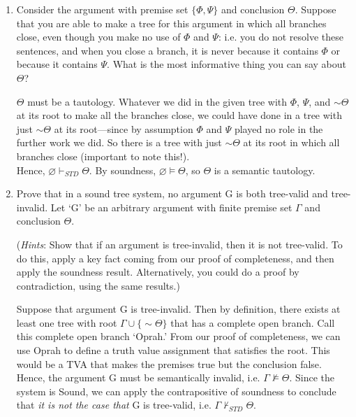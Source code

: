 \documentclass[12pt]{article}
\def\enot{\ensuremath{{\sim}}} %
\let\oldsim\sim %
\renewcommand{\sim}{{\oldsim}} %
\def\entails{\ensuremath{\vDash}}
\def\nentails{\ensuremath{\nvDash}}
\begin{document}
\begin{enumerate}


\item Consider the argument with premise set $\{\Phi, \Psi \}$ and conclusion $\Theta$. Suppose that you are able to make a tree for this argument in which all branches close, even though you make no use of $\Phi$ and $\Psi$: i.e. you do not resolve these sentences, and when you close a branch, it is never because it contains $\Phi$ or because it contains $\Psi$. What is the most informative thing you can say about $\Theta$?


$\Theta$ must be a tautology. Whatever we did in the given tree with $\Phi$, $\Psi$, and $\enot \Theta$ at its root to make all the branches close, we could have done in a tree with just $\enot \Theta$ at its root—since by assumption $\Phi$ and $\Psi$ played no role in the further work we did. So there is a tree with just $\enot \Theta$ at its root in which all branches close (important to note this!). \\ Hence, $\varnothing \vdash_{STD} \Theta$. By soundness, $\varnothing \entails \Theta$, so $\Theta$ is a semantic tautology. 

\item Prove that in a sound tree system, no argument G is both tree-valid and tree-invalid. Let `G' be an arbitrary argument with finite premise set $\Gamma$ and conclusion $\Theta$. 

(\textit{Hints}: Show that if an argument is tree-invalid, then it is not tree-valid. To do this, apply a key fact coming from our proof of completeness, and then apply the soundness result. Alternatively, you could do a proof by contradiction, using the same results.) 


Suppose that argument G is tree-invalid. Then by definition, there exists at least one tree with root $\Gamma \cup\{\enot \Theta\} $ that has a complete open branch. Call this complete open branch `Oprah.' From our proof of completeness, we can use Oprah to define a truth value assignment that satisfies the root. This would be a TVA that makes the premises true but the conclusion false. Hence, the argument G must be semantically invalid, i.e. $\Gamma \nentails \Theta$. Since the system is Sound, we can apply the contrapositive of soundness to conclude that \textit{it is not the case that} G is tree-valid, i.e. $\Gamma \nvdash_{STD} \Theta$. 


\end{enumerate}
\end{document}
